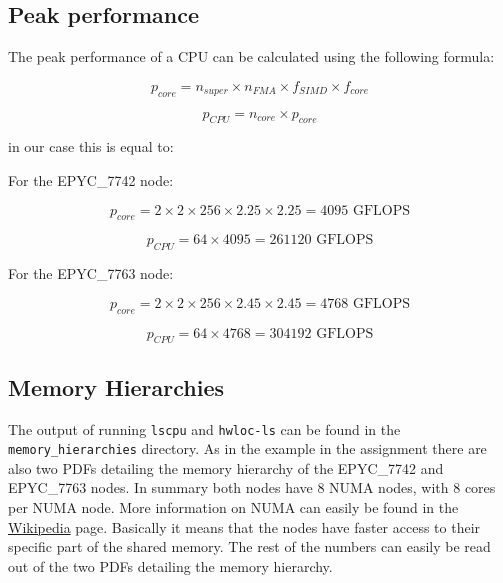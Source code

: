 \documentclass[unicode,11pt,a4paper,oneside,numbers=endperiod,openany]{scrartcl}
\begin{document}
\subsection{Peak performance}

The peak performance of a CPU can be calculated using the following formula:

\begin{equation}
    p_{core} = n_{super} \times n_{FMA} \times f_{SIMD} \times f_{core}
\end{equation}

\begin{equation}
    p_{CPU} = n_{core} \times p_{core}
\end{equation}

in our case this is equal to:

For the EPYC\_7742 node:

\begin{equation}
    p_{core} = 2 \times 2 \times 256 \times 2.25 \times 2.25 = 4095 \text{ GFLOPS}
\end{equation}

\begin{equation}
    p_{CPU} = 64 \times 4095 = 261120 \text{ GFLOPS}
\end{equation}

For the EPYC\_7763 node:

\begin{equation}
    p_{core} = 2 \times 2 \times 256 \times 2.45 \times 2.45 = 4768 \text{ GFLOPS}
\end{equation}

\begin{equation}
    p_{CPU} = 64 \times 4768 = 304192 \text{ GFLOPS}
\end{equation}

\subsection{Memory Hierarchies}

The output of running \texttt{lscpu} and \texttt{hwloc-ls} can be found in the \texttt{memory\_hierarchies} directory. As in the example in the assignment there are also two PDFs detailing the memory hierarchy of the EPYC\_7742 and EPYC\_7763 nodes. In summary both nodes have 8 NUMA nodes, with 8 cores per NUMA node. More information on NUMA can easily be found in the \href{https://en.wikipedia.org/wiki/Non-uniform_memory_access}{Wikipedia} page. Basically it means that the nodes have faster access to their specific part of the shared memory. The rest of the numbers can easily be read out of the two PDFs detailing the memory hierarchy.
\end{document}
